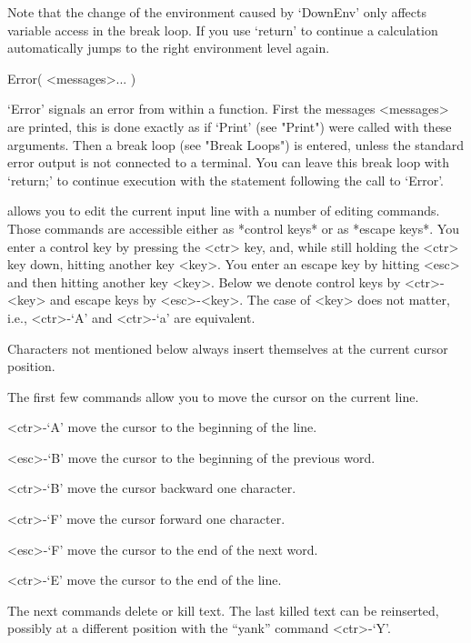 Note that the change of the environment caused by `DownEnv' only affects
variable access in the break loop. If you use `return' to continue a
calculation {\GAP} automatically jumps to the right environment level again.


\>Error( <messages>... )

`Error' signals an error from within a function. First the messages
<messages> are printed, this is done exactly as if `Print' (see "Print")
were called with these arguments. Then a break loop (see "Break Loops") is
entered, unless the standard error output is not connected to a terminal.
You can leave this break loop with `return;' to continue execution with the
statement following the call to `Error'.


{\GAP} allows you to edit the current input line with a number of editing
commands. Those commands are accessible either as *control keys* or as
*escape keys*. You enter a control key by pressing the <ctr> key, and,
while still holding the <ctr> key down, hitting another key <key>. You
enter an escape key by hitting <esc> and then hitting another key <key>.
Below we denote control keys by <ctr>-<key> and escape keys by
<esc>-<key>. The case of <key> does not matter, i.e., <ctr>-`A' and
<ctr>-`a' are equivalent.

Characters not mentioned below always insert themselves at the current
cursor position.

The first few commands allow you to move the cursor on the current line.

<ctr>-`A' move the cursor to the beginning of the line. 

<esc>-`B' move the cursor to the beginning of the previous word. 

<ctr>-`B' move the cursor backward one character. 

<ctr>-`F' move the cursor forward one character. 

<esc>-`F' move the cursor to the end of the next word. 

<ctr>-`E' move the cursor to the end of the line.

The next commands delete or kill text. The last killed text can be
reinserted, possibly at a different position with the ``yank'' command
<ctr>-`Y'.

